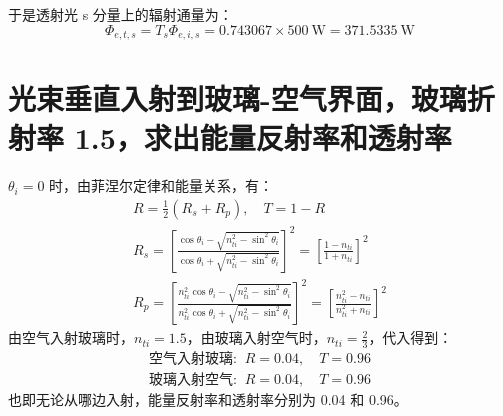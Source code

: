 \documentclass[a4paper]{article}  %
\theoremstyle{MyLineTheoremStyle} %
\theoremstyle{MyBlockTheoremStyle} %
\theoremstyle{MySubsubsectionStyle} %
\begin{document}
\begin{multicols*}{4}
于是透射光 s 分量上的辐射通量为：
\begin{equation}
\Phi_{e,t,s} = T_s \Phi_{e,i,s} = 0.743067 \times 500 \ \mathrm{W} =  371.5335 \ \mathrm{W}
\end{equation}


\section{光束垂直入射到玻璃-空气界面，玻璃折射率 1.5，求出能量反射率和透射率}

$\theta_i = 0$ 时，由菲涅尔定律和能量关系，有：
\begin{gather}
    R =  \frac{1}{2}(R_s + R_p),\quad  T = 1 - R\\ 
    R_s =  \left[ \frac{ \cos \theta_i - \sqrt{n_{ti}^2 - \sin^2 \theta_i} }{\cos \theta_i + \sqrt{n_{ti}^2 - \sin^2 \theta_i}} \right]^2 = \left[ \frac{1 - n_{ti}}{1 + n_{ti}} \right]^2 
    \\ 
    R_p = \left[ \frac{ n_{ti}^2\cos \theta_i - \sqrt{n_{ti}^2 - \sin^2 \theta_i} }{n_{ti}^2\cos \theta_i + \sqrt{n_{ti}^2 - \sin^2 \theta_i}} \right]^2 =  \left[ \frac{n_{ti}^2 - n_{ti}}{n_{ti}^2 + n_{ti}} \right]^2
\end{gather}
由空气入射玻璃时，$n_{ti} = 1.5$，由玻璃入射空气时，$n_{ti} = \frac{2}{3}$，代入得到：
\begin{gather*}
\text{空气入射玻璃: }\ R = 0.04,\quad  T = 0.96 \\ 
\text{玻璃入射空气: }\ R = 0.04,\quad  T = 0.96 
\end{gather*}
也即无论从哪边入射，能量反射率和透射率分别为 0.04 和 0.96。




\end{multicols*}
\end{document}

